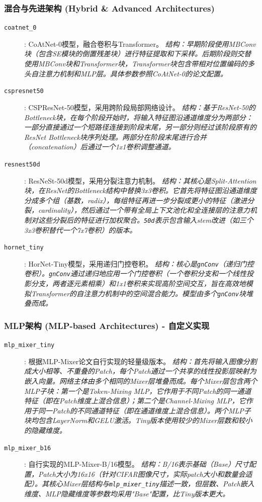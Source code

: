\documentclass[a4paper]{article}
\begin{document}
\subsubsection{混合与先进架构 (Hybrid \& Advanced Architectures)}
\begin{description}
    \item[\texttt{coatnet\_0}]: CoAtNet-0模型，融合卷积与Transformer。 \textit{结构：早期阶段使用MBConv块（包含SE模块的倒置残差块）进行特征提取和下采样。后期阶段则交替使用MBConv块和Transformer块，Transformer块包含带相对位置编码的多头自注意力机制和MLP层。具体参数参照CoAtNet-0的论文配置。}
    \item[\texttt{cspresnet50}]: CSPResNet-50模型，采用跨阶段局部网络设计。 \textit{结构：基于ResNet-50的Bottleneck块，在每个阶段开始时，将输入特征图沿通道维度分为两部分：一部分直接通过一个短路径连接到阶段末尾，另一部分则经过该阶段原有的ResNet Bottleneck块序列处理。两部分在阶段末尾进行合并（concatenation）后通过一个1x1卷积调整通道。}
    \item[\texttt{resnest50d}]: ResNeSt-50d模型，采用分裂注意力机制。 \textit{结构：其核心是Split-Attention块，在ResNet的Bottleneck结构中替换3x3卷积。它首先将特征图沿通道维度分成多个组（基数，radix），每组特征再进一步分裂成更小的特征（激进分裂，cardinality），然后通过一个带有全局上下文池化和全连接层的注意力机制对这些分裂后的特征进行加权聚合。\texttt{50d}表示包含输入stem改进（如三个3x3卷积替代一个7x7卷积）的版本。}
    \item[\texttt{hornet\_tiny}]: HorNet-Tiny模型，采用递归门控卷积。 \textit{结构：核心是\texttt{gnConv}（递归门控卷积）。\texttt{gnConv}通过递归地应用一个门控卷积（一个卷积分支和一个线性投影分支，两者逐元素相乘）和1x1卷积来实现高阶空间交互，旨在高效地模拟Transformer的自注意力机制中的空间混合能力。模型由多个\texttt{gnConv}块堆叠而成。}
\end{description}

\subsubsection{MLP架构 (MLP-based Architectures) - 自定义实现}
\begin{description}
    \item[\texttt{mlp\_mixer\_tiny}]: 根据MLP-Mixer论文自行实现的轻量级版本。 \textit{结构：首先将输入图像分割成大小相等、不重叠的Patch，每个Patch通过一个共享的线性投影层映射为嵌入向量。网络主体由多个相同的Mixer层堆叠而成。每个Mixer层包含两个MLP子块：第一个是Token-Mixing MLP，它作用于不同Patch的同一通道特征（即在Patch维度上混合信息）；第二个是Channel-Mixing MLP，它作用于同一Patch的不同通道特征（即在通道维度上混合信息）。两个MLP子块均包含LayerNorm和GELU激活。Tiny版本使用较少的Mixer层数和较小的隐藏维度。}
    \item[\texttt{mlp\_mixer\_b16}]: 自行实现的MLP-Mixer-B/16模型。 \textit{结构：B/16表示基础（Base）尺寸配置，Patch大小为16x16（针对CIFAR图像尺寸，实际patch大小和数量会适配）。其核心Mixer层结构与\texttt{mlp\_mixer\_tiny}描述一致，但层数、Patch嵌入维度、MLP隐藏维度等参数均采用"Base"配置，比Tiny版本更大。}
\end{description}
\end{document}
